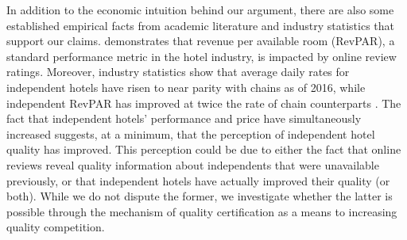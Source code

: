 \documentclass[12pt, leqno]{article}
\begin{document}
In addition to the economic intuition behind our argument, there are also some established empirical facts from academic literature and industry statistics that support our claims.  demonstrates that revenue per available room (RevPAR), a standard performance metric in the hotel industry, is impacted by online review ratings. Moreover, industry statistics show that average daily rates for independent hotels have risen to near parity with chains as of 2016, while independent RevPAR has improved at twice the rate of chain counterparts \citep{lodging2017}. The fact that independent hotels' performance and price have simultaneously increased suggests, at a minimum, that the perception of independent hotel quality has improved. This perception could be due to either the fact that online reviews reveal quality information about independents that were unavailable previously, or that independent hotels have actually improved their quality (or both). While we do not dispute the former, we investigate whether the latter is possible through the mechanism of quality certification as a means to increasing quality competition.

\end{document}
